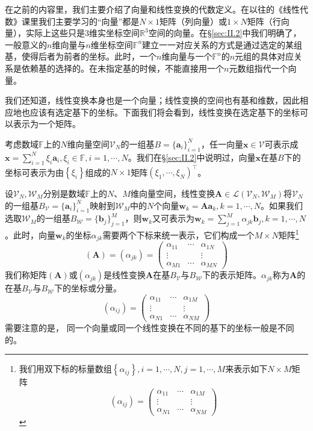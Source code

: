 \documentclass[main.tex]{subfiles}
\begin{document}
在之前的内容里，我们主要介绍了向量和线性变换的代数定义。在以往的《线性代数》课里我们主要学习的“向量”都是$N\times 1$矩阵（列向量）或$1\times N$矩阵（行向量），实际上这些只是3维实坐标空间$\mathbb{R}^3$空间的向量。在\S\ref{sec:II.2}中我们明确了，一般意义的$n$维向量与$n$维坐标空间$\mathbb{F}^n$建立一一对应关系的方式是通过选定的某组基，使得后者为前者的坐标。此时，一个$n$维向量与一个$\mathbb{F}^n$的$n$元组的具体对应关系是依赖基的选择的。在未指定基的时候，不能直接用一个$n$元数组指代一个向量。

我们还知道，线性变换本身也是一个向量；线性变换的空间也有基和维数，因此相应地也应该有选定基下的坐标。下面我们将会看到，线性变换在选定基下的坐标可以表示为一个矩阵\cite[\S7.3“3”,p.~178]{周胜林2012线性代数}。

考虑数域$\mathbb{F}$上的$N$维向量空间$\mathcal{V}_N$的一组基$B=\{\mathbf{a}_i\}_{i=1}^N$，任一向量$\mathbf{x}\in\mathcal{V}$可表示成$\mathbf{x}=\sum_{i=1}^N\xi_i\mathbf{a}_i,\xi_i\in\mathbb{F},i=1,\cdots,N$。我们在\S\ref{sec:II.2}中说明过，向量$\mathbf{x}$在基$B$下的坐标可表示为由$\left\{\xi_i\right\}$组成的$N\times 1$矩阵$\left(\xi_1,\cdots,\xi_N\right)^\intercal$。

设$\mathcal{V}_N,\mathcal{W}_M$分别是数域$\mathbb{F}$上的$N$、$M$维向量空间，线性变换$\mathbf{A}\in\mathcal{L}\left(\mathcal{V}_N,\mathcal{W}_M\right)$将$\mathcal{V}_N$的一组基$B_\mathcal{V}=\{\mathbf{a}_i\}_{i=1}^N$映射到$\mathcal{W}_M$中的$N$个向量$\mathbf{w}_k=\mathbf{Aa}_k,k=1,\cdots,N$。如果我们选取$\mathcal{W}_M$的一组基$B_\mathcal{W}=\{\mathbf{b}_j\}_{j=1}^M$，则$\mathbf{w}_k$又可表示为$\mathbf{w}_k=\sum_{j=1}^M\alpha_{jk}\mathbf{b}_j,k=1,\cdots,N$。此时，向量$\mathbf{w}_k$的坐标$\alpha_{jk}$需要两个下标来统一表示，它们构成一个$M\times N$矩阵\footnote{我们用双下标的标量数组$\left\{\alpha_{ij}\right\},i=1,\cdots,N,j=1,\cdots,M$来表示如下$N\times M$矩阵
\[\left(\alpha_{ij}\right)=\left(\begin{array}{ccc}\alpha_{11}&\cdots&\alpha_{1M}\\\vdots&&\vdots\\\alpha_{N1}&\cdots&\alpha_{NM}\end{array}\right)\]}
\[\left(\mathbf{A}\right)=\left(\alpha_{jk}\right)=\left(\begin{array}{ccc}\alpha_{11}&\cdots&\alpha_{1N}\\\vdots&&\vdots\\\alpha_{M1}&\cdots&\alpha_{MN}\end{array}\right)\]
我们称矩阵$\left(\mathbf{A}\right)$或$\left(\alpha_{jk}\right)$是线性变换$\mathbf{A}$在基$B_\mathcal{V}$与$B_\mathcal{W}$下的表示矩阵。$\alpha_{jk}$称为$\mathbf{A}$的在基$B_\mathcal{V}$与$B_\mathcal{W}$下的坐标或分量。
\[\left(\alpha_{ij}\right)=\left(\begin{array}{ccc}\alpha_{11}&\cdots&\alpha_{1M}\\\vdots&&\vdots\\\alpha_{N1}&\cdots&\alpha_{NM}\end{array}\right)\]
需要注意的是， 同一个向量或同一个线性变换在不同的基下的坐标一般是不同的。
\end{document}
